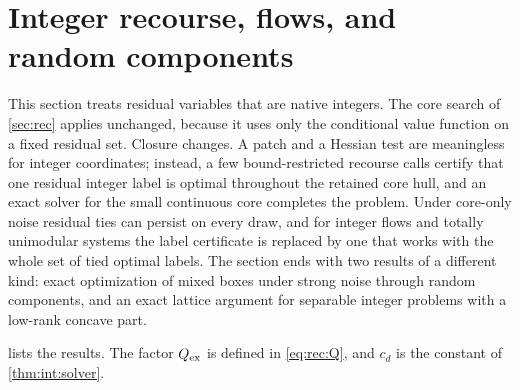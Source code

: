 \section{Integer recourse, flows, and random components}\label{sec:int}

This section treats residual variables that are native integers. The core
search of \cref{sec:rec} applies unchanged, because it uses only the
conditional value function on a fixed residual set. Closure changes. A
patch and a Hessian test are meaningless for integer coordinates; instead,
a few bound-restricted recourse calls certify that one residual integer
label is optimal throughout the retained core hull, and an exact solver for
the small continuous core completes the problem. Under core-only noise
residual ties can persist on every draw, and for integer flows and totally
unimodular systems the label certificate is replaced by one that works with
the whole set of tied optimal labels. The section ends with two results of a
different kind: exact optimization of mixed boxes under strong noise through
random components, and an exact lattice argument for separable integer
problems with a low-rank concave part.

 lists the results. The factor $Q_{\rm ex}$ is defined
in \eqref{eq:rec:Q}, and $c_d$ is the constant of \cref{thm:int:solver}.

